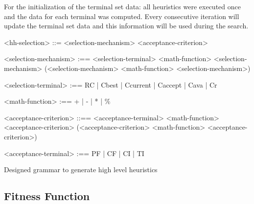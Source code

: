 \documentclass[conference]{IEEEtran}
\begin{document}
 

 For the initialization of the terminal set data: all heuristics were executed once and the data for each terminal was computed. Every consecutive iteration will update the terminal set data and this information will be used during the search.
 

 \begin{Grammar}
 	\begin{grammar}
 		<hh-selection> ::= <selection-mechanism> <acceptance-criterion> 
 		
 		<selection-mechanism> :==  <selection-terminal>   
 		\alt <selection-mechanism> <math-function> <selection-mechanism> 
 		\alt (<selection-mechanism> <math-function> <selection-mechanism>) 
 		
 		<selection-terminal> :== 
 		RC 
 		| Cbest 
 		| Ccurrent 
 		| Caccept 
 		| Cava 
 		| Cr
 		
 		<math-function> :== + 
 		| - 
 		| * 
 		| \%
 		
 		<acceptance-criterion> ::== <acceptance-terminal> 
 		\alt <acceptance-criterion> <math-function>
 		<acceptance-criterion>
 		\alt (<acceptance-criterion>  <math-function> <acceptance-criterion>) 
 		
 		<acceptance-terminal> :== PF | CF | CI | TI
 		
 		
 		
 	\end{grammar}
 	\caption{Designed grammar to generate high level heuristics}
 	\label{grammar:proposedGrammar}
 \end{Grammar}

%
\subsection{Fitness Function}
\label{subsection:fitnessFunction}
\end{document}
